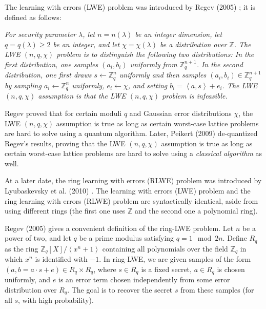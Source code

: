 The learning with errors (LWE) problem was introduced by Regev (2005) \cite{Regev:2005:LLE:1060590.1060603}; it is defined as follows:

\textit{For security parameter $\lambda$, let $n = n(\lambda)$ be an integer dimension, let $q=q(\lambda) \geq 2$ be an integer, and let $\chi = \chi(\lambda)$ be a distribution over $\mathbb{Z}$. The LWE $(n, q, \chi)$ problem is to distinguish the following two distributions: In the first distribution, one samples $(a_{i},b_{i})$ uniformly from $\mathbb{Z}_{q}^{n+1}$. In the second distribution, one first draws $s \leftarrow \mathbb{Z}_{q}^{n}$ uniformly and then samples $(a_{i}, b_{i}) \in \mathbb{Z}_{q}^{n+1}$ by sampling $a_{i} \leftarrow \mathbb{Z}_{q}^{n}$ uniformly, $e_{i} \leftarrow \chi$, and setting $b_{i} = \left \langle a,s  \right \rangle + e_{i}$. The LWE $(n, q, \chi)$ assumption is that the LWE $(n, q, \chi)$ problem is infeasible.}

Regev proved that for certain moduli $q$ and Gaussian error distributions $\chi$, the LWE $(n, q, \chi)$ assumption is true as long as certain worst-case lattice problems are hard to solve using a quantum algorithm. Later, Peikert (2009) \cite{Peikert:2009:PCW:1536414.1536461} de-quantized Regev's results, proving that the LWE $(n, q, \chi)$ assumption is true as long as certain worst-case lattice problems are hard to solve using a \emph{classical algorithm} as well.

At a later date, the ring learning with errors (RLWE) problem was introduced by Lyubaskevsky et al. (2010) \cite{rlwe2010}. The learning with errors (LWE) problem and the ring learning with errors (RLWE) problem are syntactically identical, aside from using different rings (the first one uses $\mathbb{Z}$ and the second one a polynomial ring). 

Regev (2005) \cite{regevlearning} gives a convenient definition of the ring-LWE problem. Let $n$ be a power of two, and let $q$ be a prime modulus satisfying $q=1 \mod 2n$. Define $R_{q}$ as the ring $\mathbb{Z}_{q}[X] / \left \langle x^{n} + 1 \right \rangle$ containing all polynomials over the field $\mathbb{Z}_{q}$ in which $x^{n}$ is identified with $-1$. In ring-LWE, we are given samples of the form $(a, b = a \cdot s + e) \in R_{q} \times R_{q}$, where $s \in R_{q}$ is a fixed secret, $a \in R_{q}$ is chosen uniformly, and $e$ is an error term chosen independently from some error distribution over $R_{q}$. The goal is to recover the secret $s$ from these samples (for all $s$, with high probability).

